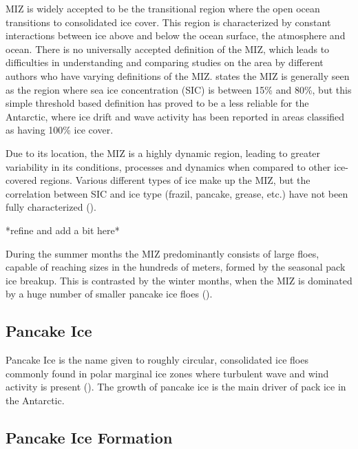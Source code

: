 \ac{MIZ} is widely accepted to be the transitional region where the open ocean transitions to consolidated ice cover. This region is characterized by constant interactions between ice above and below the ocean surface, the atmosphere and ocean. There is no universally accepted definition of the \ac{MIZ}, which leads to difficulties in understanding and comparing studies on the area by different authors who have varying definitions of the \ac{MIZ}. \cite{vichiIndicatorSeaIce2022} states the \ac{MIZ} is generally seen as the region where sea ice concentration (SIC) is between 15\% and 80\%, but this simple threshold based definition has proved to be a less reliable for the Antarctic, where ice drift and wave activity has been reported in areas classified as having 100\% ice cover. 

Due to its location, the \ac{MIZ} is a highly dynamic region, leading to greater variability in its conditions, processes and dynamics when compared to other ice-covered regions. Various different types of ice make up the \ac{MIZ}, but the correlation between SIC and ice type (frazil, pancake, grease, etc.) have not been fully characterized (\cite{vichiIndicatorSeaIce2022}).

*refine and add a bit here*

During the summer months the \ac{MIZ} predominantly consists of large floes, capable of reaching sizes in the hundreds of meters, formed by the seasonal pack ice breakup. This is contrasted by the winter months, when the \ac{MIZ} is dominated by a huge number of smaller pancake ice floes (\cite{alberelloPhysicalModelWave2021}).

\subsection{Pancake Ice}
\label{subsec:ch2.section2.subsec2}

Pancake Ice is the name given to roughly circular, consolidated ice floes commonly found in polar marginal ice zones where turbulent wave and wind activity is present (\cite{doblePancakeIceFormation2003}). The growth of pancake ice is the main driver of pack ice in the Antarctic.

\subsection{Pancake Ice Formation}
\label{subsec:ch2.section2.subsec3}

